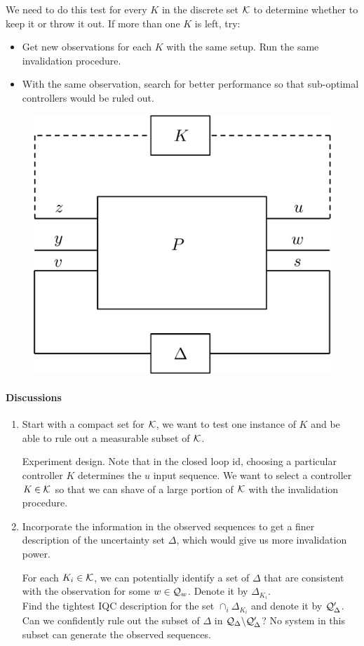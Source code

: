 \documentclass[11pt, onecolumn]{article}
\begin{document}
We need to do this test for every $K$ in the discrete set $\mathcal K$ to determine whether to keep it or
throw it out. If more than one $K$ is left, try:
\begin{itemize}
\item Get new observations for each $K$ with the same setup. Run the same invalidation procedure.
\item With the same observation, search for better performance so that sub-optimal controllers would
  be ruled out.
\end{itemize}



\begin{figure}[h!]
  \centering
  \includegraphics[width=.4\linewidth]{sys1.pdf}
\end{figure}




\paragraph{Discussions}
\begin{enumerate}
\item Start with a compact set for $\mathcal K$, we want to test one instance of $K$ and be able to rule
  out a measurable subset of $\mathcal K$.

  Experiment design. Note that in the closed loop id, choosing a particular controller $K$
  determines the $u$ input sequence. We want to select a controller $K\in \mathcal K$ so that we can
  shave of a large portion of $\mathcal K$ with the invalidation procedure.

\item Incorporate the information in the observed sequences to get a finer description of the
  uncertainty set $\Delta$, which would give us more invalidation power.

 For each $K_i\in\mathcal K$, we can potentially identify a set of $\Delta$ that are consistent with
  the observation for some $w\in\mathcal Q_{w}$. Denote it by $\Delta_{K_i}$.
  \\
  Find the tightest IQC description for the set $\cap_i \Delta_{K_i}$ and denote it by $\mathcal
  Q_{\Delta}'$.  Can we confidently rule out the subset of $\Delta$ in $\mathcal Q_{\Delta} \backslash
  \mathcal Q_{\Delta}'$?  No system in this subset can generate the observed sequences.


\end{enumerate}








\end{document}
